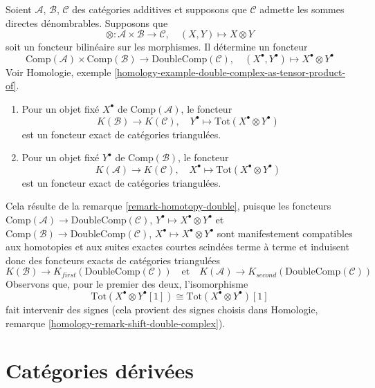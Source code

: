 \begin{remark}
\label{remark-double-complex-as-tensor-product-of}
Soient $\mathcal{A}$, $\mathcal{B}$, $\mathcal{C}$ des catégories additives et
supposons que $\mathcal{C}$ admette les sommes directes dénombrables. Supposons
que
$$
\otimes : \mathcal{A} \times \mathcal{B} \longrightarrow \mathcal{C},
\quad
(X, Y) \longmapsto X \otimes Y
$$
soit un foncteur bilinéaire sur les morphismes. Il détermine un foncteur
$$
\text{Comp}(\mathcal{A}) \times \text{Comp}(\mathcal{B})
\longrightarrow
\text{DoubleComp}(\mathcal{C}), \quad
(X^\bullet, Y^\bullet)
\longmapsto
X^\bullet \otimes Y^\bullet
$$
Voir Homologie, exemple
\ref{homology-example-double-complex-as-tensor-product-of}.
\begin{enumerate}
\item Pour un objet fixé $X^\bullet$ de $\text{Comp}(\mathcal{A})$, le foncteur
$$
K(\mathcal{B}) \longrightarrow K(\mathcal{C}), \quad
Y^\bullet \longmapsto \text{Tot}(X^\bullet \otimes Y^\bullet)
$$
est un foncteur exact de catégories triangulées.
\item Pour un objet fixé $Y^\bullet$ de $\text{Comp}(\mathcal{B})$, le foncteur
$$
K(\mathcal{A}) \longrightarrow K(\mathcal{C}), \quad
X^\bullet \longmapsto \text{Tot}(X^\bullet \otimes Y^\bullet)
$$
est un foncteur exact de catégories triangulées.
\end{enumerate}
Cela résulte de la remarque \ref{remark-homotopy-double}, puisque les foncteurs
$\text{Comp}(\mathcal{A}) \to \text{DoubleComp}(\mathcal{C})$,
$Y^\bullet \mapsto X^\bullet \otimes Y^\bullet$ et
$\text{Comp}(\mathcal{B}) \to \text{DoubleComp}(\mathcal{C})$,
$X^\bullet \mapsto X^\bullet \otimes Y^\bullet$ sont manifestement
compatibles aux homotopies et aux suites exactes courtes scindées terme à terme
et induisent donc des foncteurs exacts de catégories triangulées
$$
K(\mathcal{B}) \to K_{first}(\text{DoubleComp}(\mathcal{C}))
\quad\text{et}\quad
K(\mathcal{A}) \to K_{second}(\text{DoubleComp}(\mathcal{C}))
$$
Observons que, pour le premier des deux, l'isomorphisme
$$
\text{Tot}(X^\bullet \otimes Y^\bullet[1]) \cong
\text{Tot}(X^\bullet \otimes Y^\bullet)[1]
$$
fait intervenir des signes (cela provient des signes choisis dans Homologie,
remarque \ref{homology-remark-shift-double-complex}).
\end{remark}


\section{Catégories dérivées}
\label{section-derived-categories}

